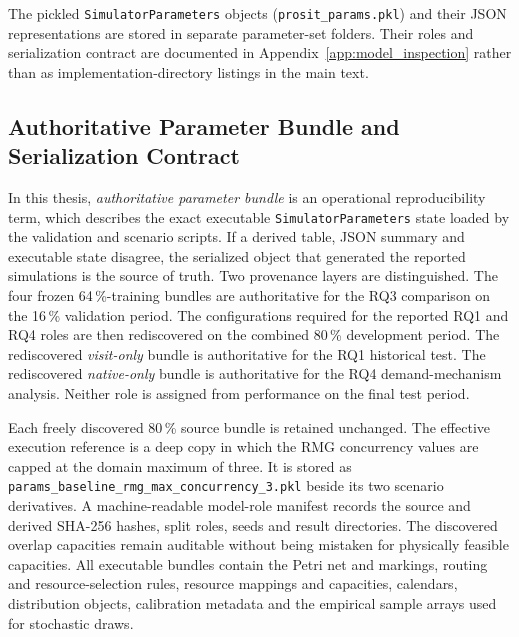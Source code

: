 The pickled \texttt{SimulatorParameters} objects
(\texttt{prosit\_params.pkl}) and their JSON representations are stored
in separate parameter-set folders. Their roles and serialization contract are
documented in Appendix~\ref{app:model_inspection} rather than as
implementation-directory listings in the main text.

\subsection{Authoritative Parameter Bundle and Serialization Contract}
\label{sec:authoritative_parameter_bundle}

In this thesis, \emph{authoritative parameter bundle} is an operational
reproducibility term, which describes the exact executable
\texttt{SimulatorParameters} state loaded by the validation and scenario
scripts. If a derived table, JSON summary and executable state disagree,
the serialized object that generated the reported simulations is
the source of truth. Two provenance layers are distinguished. The four frozen
64\,\%-training bundles are authoritative for the RQ3 comparison on the
16\,\% validation period. The configurations required for the reported RQ1
and RQ4 roles are then rediscovered on the combined 80\,\% development
period. The
rediscovered \textit{visit-only} bundle is authoritative for the RQ1
historical test. The rediscovered \textit{native-only} bundle is authoritative
for the RQ4 demand-mechanism analysis. Neither role is assigned from performance on
the final test period.

Each freely discovered 80\,\% source bundle is retained unchanged. The
effective execution reference is a deep copy in which the RMG concurrency
values are capped at the domain maximum of three. It is stored as
\texttt{params\_baseline\_rmg\_max\_concurrency\_3.pkl} beside its two
scenario derivatives. A machine-readable model-role manifest records the
source and derived SHA-256 hashes, split roles, seeds and result directories.
The discovered overlap capacities remain
auditable without being mistaken for physically feasible capacities. All
executable bundles contain the Petri net and markings, routing and
resource-selection rules, resource mappings and capacities, calendars,
distribution objects, calibration metadata and the empirical sample arrays
used for stochastic draws.

